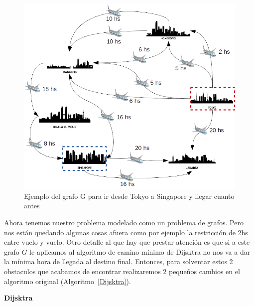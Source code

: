 \begin{figure}[h!]
  \centering
  \includegraphics[scale=0.75]{Imagenes/ej1_grafo1}
  \caption{Ejemplo del grafo G para ir desde Tokyo a Singapore y llegar cuanto antes}
  \label{ej1_grafo1}
\end{figure}

\newpage
Ahora tenemos nuestro problema modelado como un problema de grafos. Pero nos están quedando algunas cosas afuera como por ejemplo 
la restricción de 2hs entre vuelo y vuelo. Otro detalle al que hay que prestar atención es que si a este grafo $G$ le aplicamos al 
algoritmo de camino mínimo de Dijsktra no nos va a dar la mínima hora de llegada al destino final. 
Entonces, para solventar estos 2 obstaculos que acabamos de encontrar realizaremos 2 pequeños cambios en el algoritmo original (Algoritmo~\ref{Dijsktra}).

\LinesNumbered
\begin{algorithm}[H]
\DontPrintSemicolon
{}
\caption{\textbf{Dijsktra } \label{Dijsktra}}
\end{algorithm}


